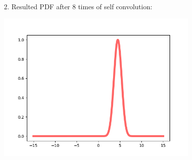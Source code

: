 \documentclass[a4paper, 10pt]{article}
\begin{document}
\begin{subproblems}[start=2]
    \newpage

    2. Resulted PDF after 8 times of self convolution:
    \begin{center}
        \includegraphics[width=0.75\textwidth]{images/problem_6_2_8_conv_uniform_pdf.png}
    \end{center}
\end{subproblems}
\end{document}
